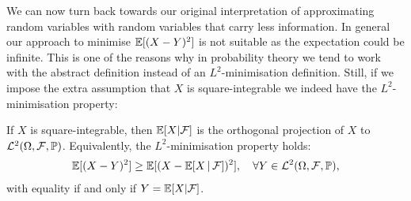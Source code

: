 We can now turn back towards our original interpretation of approximating random variables with random variables that carry less information. In general our approach to minimise $\E[(X-Y)^2]$ is not suitable as the expectation could be infinite. This is one of the reasons why in probability theory we tend to work with the abstract definition instead of an $L^2$-minimisation definition. Still, if we impose the extra assumption that $X$ is square-integrable we indeed have the $L^2$-minimisation property:
\begin{laussagewerkzeug}
\begin{theorem}
	If $X$ is square-integrable, then $\mathbb E[X|\cF]$ is the orthogonal projection of $X$ to $\mathcal L^2(\Omega, \mathcal F, \P)$. Equivalently, the $L^2$-minimisation property holds:
	\begin{align*}
		\mathbb E[(X-Y)^2] \geq \mathbb E[(X-\mathbb E[X\,|\,\cF])^2],\quad \forall Y\in \mathcal L^2(\Omega, \mathcal F, \mathbb P),
	\end{align*}
	with equality if and only if $Y = \mathbb E[X|\cF]$.
\end{theorem}
\end{laussagewerkzeug}
